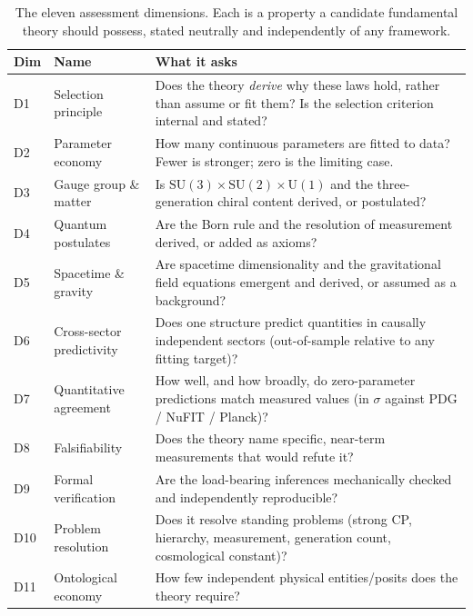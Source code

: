 \documentclass[11pt]{article}
\begin{document}
\begin{table}[htbp]
\centering
\caption{The eleven assessment dimensions.  Each is a property a candidate
fundamental theory should possess, stated neutrally and independently of any
framework.}
\label{tab:rubric}
\small\renewcommand{\arraystretch}{1.25}
\begin{tabularx}{\textwidth}{@{}p{0.7cm}P{3.0cm}Y@{}}
\toprule
\textbf{Dim} & \textbf{Name} & \textbf{What it asks} \\
\midrule
D1 & Selection principle &
  Does the theory \emph{derive} why these laws hold, rather than assume or fit
  them?  Is the selection criterion internal and stated? \\
D2 & Parameter economy &
  How many continuous parameters are fitted to data?  Fewer is stronger; zero is
  the limiting case. \\
D3 & Gauge group \& matter &
  Is $\mathrm{SU}(3)\times\mathrm{SU}(2)\times\mathrm{U}(1)$ and the
  three-generation chiral content derived, or postulated? \\
D4 & Quantum postulates &
  Are the Born rule and the resolution of measurement derived, or added as
  axioms? \\
D5 & Spacetime \& gravity &
  Are spacetime dimensionality and the gravitational field equations emergent and
  derived, or assumed as a background? \\
D6 & Cross-sector predictivity &
  Does one structure predict quantities in causally independent sectors
  (out-of-sample relative to any fitting target)? \\
D7 & Quantitative agreement &
  How well, and how broadly, do zero-parameter predictions match measured values
  (in $\sigma$ against PDG / NuFIT / Planck)? \\
D8 & Falsifiability &
  Does the theory name specific, near-term measurements that would refute it? \\
D9 & Formal verification &
  Are the load-bearing inferences mechanically checked and independently
  reproducible? \\
D10 & Problem resolution &
  Does it resolve standing problems (strong CP, hierarchy, measurement,
  generation count, cosmological constant)? \\
D11 & Ontological economy &
  How few independent physical entities/posits does the theory require? \\
\bottomrule
\end{tabularx}
\end{table}
\end{document}
